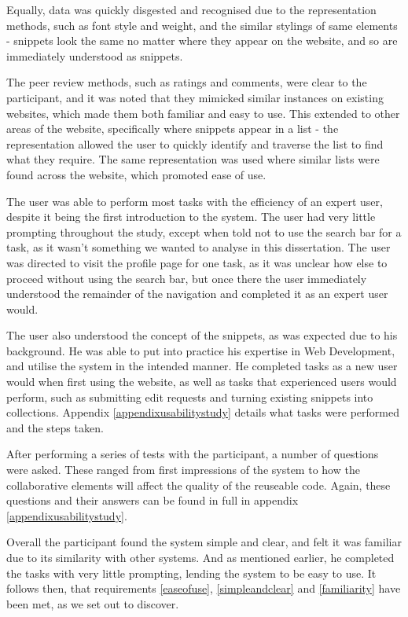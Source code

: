 Equally, data was quickly disgested and recognised due to the representation methods, such as font style and weight, and the similar stylings of same elements - snippets look the same no matter where they appear on the website, and so are immediately understood as snippets.

The peer review methods, such as ratings and comments, were clear to the participant, and it was noted that they mimicked similar instances on existing websites, which made them both familiar and easy to use. 
This extended to other areas of the website, specifically where snippets appear in a list - the representation allowed the user to quickly identify and traverse the list to find what they require. 
The same representation was used where similar lists were found across the website, which promoted ease of use.

The user was able to perform most tasks with the efficiency of an expert user, despite it being the first introduction to the system.
The user had very little prompting throughout the study, except when told not to use the search bar for a task, as it wasn't something we wanted to analyse in this dissertation.
The user was directed to visit the profile page for one task, as it was unclear how else to proceed without using the search bar, but once there the user immediately understood the remainder of the navigation and completed it as an expert user would.

The user also understood the concept of the snippets, as was expected due to his background.
He was able to put into practice his expertise in Web Development, and utilise the system in the intended manner.
He completed tasks as a new user would when first using the website, as well as tasks that experienced users would perform, such as submitting edit requests and turning existing snippets into collections.
Appendix \ref{appendixusabilitystudy} details what tasks were performed and the steps taken.

After performing a series of tests with the participant, a number of questions were asked. 
These ranged from first impressions of the system to how the collaborative elements will affect the quality of the reuseable code. 
Again, these questions and their answers can be found in full in appendix \ref{appendixusabilitystudy}.

Overall the participant found the system simple and clear, and felt it was familiar due to its similarity with other systems.
And as mentioned earlier, he completed the tasks with very little prompting, lending the system to be easy to use. 
It follows then, that requirements \ref{easeofuse}, \ref{simpleandclear} and \ref{familiarity} have been met, as we set out to discover. 


